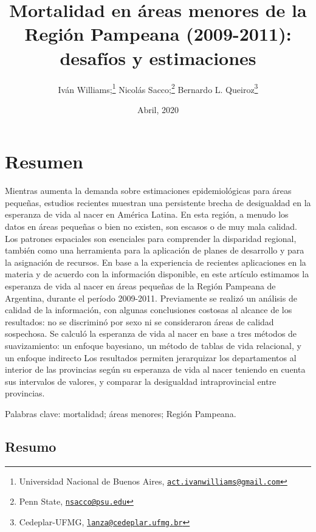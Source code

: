 \documentclass[12pt,spanish,]{article}
\title{Mortalidad en áreas menores de la Región Pampeana (2009-2011): desafíos
y estimaciones}
\author{Iván Williams;\footnote{Universidad Nacional de Buenos Aires,
  \href{mailto:act.ivanwilliams@gmail.com}{\nolinkurl{act.ivanwilliams@gmail.com}}}
Nicolás Sacco;\footnote{Penn State,
  \href{mailto:nsacco@psu.edu}{\nolinkurl{nsacco@psu.edu}}} Bernardo L.
Queiroz\footnote{Cedeplar-UFMG,
  \href{mailto:lanza@cedeplar.ufmg.br}{\nolinkurl{lanza@cedeplar.ufmg.br}}}}
\date{Abril, 2020}
\begin{document}
\maketitle

\hypertarget{resumen}{%
\section{Resumen}\label{resumen}}

Mientras aumenta la demanda sobre estimaciones epidemiológicas para
áreas pequeñas, estudios recientes muestran una persistente brecha de
desigualdad en la esperanza de vida al nacer en América Latina. En esta
región, a menudo los datos en áreas pequeñas o bien no existen, son
escasos o de muy mala calidad. Los patrones espaciales son esenciales
para comprender la disparidad regional, también como una herramienta
para la aplicación de planes de desarrollo y para la asignación de
recursos. En base a la experiencia de recientes aplicaciones en la
materia y de acuerdo con la información disponible, en este artículo
estimamos la esperanza de vida al nacer en áreas pequeñas de la Región
Pampeana de Argentina, durante el período 2009-2011. Previamente se
realizó un análisis de calidad de la información, con algunas
conclusiones costosas al alcance de los resultados: no se discriminó por
sexo ni se consideraron áreas de calidad sospechosa. Se calculó la
esperanza de vida al nacer en base a tres métodos de suavizamiento: un
enfoque bayesiano, un método de tablas de vida relacional, y un enfoque
indirecto Los resultados permiten jerarquizar los departamentos al
interior de las provincias según su esperanza de vida al nacer teniendo
en cuenta sus intervalos de valores, y comparar la desigualdad
intraprovincial entre provincias.

Palabras clave: mortalidad; áreas menores; Región Pampeana.

\hypertarget{resumo}{%
\subsection{Resumo}\label{resumo}}
\end{document}
